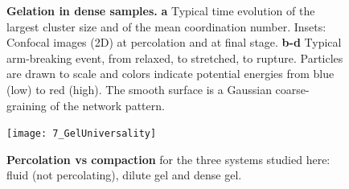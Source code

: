 \begin{figure}
	\centering
	\caption{\textbf{Gelation in dense samples.} \textbf{a} Typical time evolution of the largest cluster size and of the mean coordination number. Insets: Confocal images (2D) at percolation and at final stage. \textbf{b-d} Typical arm-breaking event, from relaxed, to stretched, to rupture. Particles are drawn to scale and colors indicate potential energies from blue (low) to red (high). The smooth surface is a Gaussian coarse-graining of the network pattern. %
	}
	\label{fig:dense}
\end{figure}

\begin{figure}
	\centering
	\texttt{[image: 7\_GelUniversality]}
	\caption{\textbf{Percolation vs compaction} for the three systems studied here: fluid (not percolating), dilute gel and dense gel.}
	\label{fig:general}
\end{figure}
